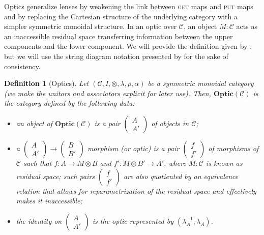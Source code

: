\documentclass[12pt,a4paper,openright,twoside]{report}
\theoremstyle{plain}
\newtheorem{definition}[proposition]{Definition}
\theoremstyle{definition}
\begin{document}
Optics generalize lenses by weakening the link between \textsc{get} maps and \textsc{put} maps and by replacing the Cartesian structure of the underlying category with a simpler symmetric monoidal structure. In an optic over $\mathcal{C}$, an object $M : \mathcal{C}$ acts as an inaccessible residual space transferring information between the upper components and the lower component.
We will provide the definition given by \cite{riley2018categories}, but we will use the string diagram notation presented by \cite{gavranovic2024fundamental} for the sake of consistency.

\begin{definition}[Optics]
  Let $(\mathcal{C}, I, \otimes, \lambda, \rho, \alpha)$ be a symmetric monoidal category (we make the unitors and associators explicit for later use). Then, $\mathbf{Optic}(\mathcal{C})$ is the category defined by the following data:
  \begin{itemize}
    \item an object of $\mathbf{Optic}(\mathcal{C})$ is a pair $\left(\begin{smallmatrix} A \\ A' \end{smallmatrix}\right)$ of objects in $\mathcal{C}$; 
    \item a $\left(\begin{smallmatrix} A \\ A' \end{smallmatrix}\right) \to \left(\begin{smallmatrix} B \\ B' \end{smallmatrix}\right)$ morphism (or optic) is a pair $\left(\begin{smallmatrix} f \\ f' \end{smallmatrix}\right)$ of morphisms of $\mathcal{C}$ such that $f: A \to M \otimes B$ and $f': M \otimes B' \to A'$, where $M : \mathcal{C}$ is known as residual space; such pairs $\left(\begin{smallmatrix} f \\ f' \end{smallmatrix}\right)$ are also quotiented by an equivalence relation that allows for reparametrization of the residual space and effectively makes it inaccessible;
    \item the identity on $\left(\begin{smallmatrix} A \\ A' \end{smallmatrix}\right)$ is the optic represented by $(\lambda_A^{-1}, \lambda_A)$.
  \end{itemize}
\end{definition}
\end{document}
